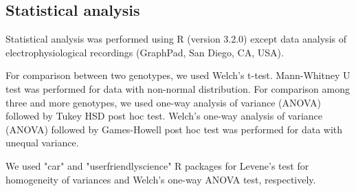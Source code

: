 \subsection*{Statistical analysis}

Statistical analysis was performed using R (version 3.2.0)\cite{R} except data analysis of electrophysiological recordings (GraphPad, San Diego, CA, USA).

For comparison between two genotypes, we used Welch's t-test.
Mann-Whitney U test was performed for data with non-normal distribution.
For comparison among three and more genotypes, we used one-way analysis of variance (ANOVA) followed by Tukey HSD post hoc test. 
Welch's one-way analysis of variance (ANOVA) followed by Games-Howell post hoc test was performed for data with unequal variance.

We used "car"\cite{car} and "userfriendlyscience"\cite{user} R packages for Levene's test for homogeneity of variances and Welch's one-way ANOVA test, respectively. 
  
  
  
  
  
  
  